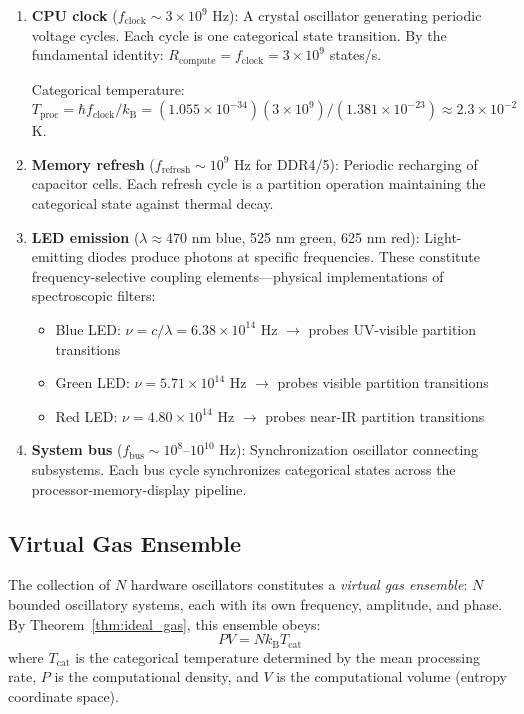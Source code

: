 \documentclass[11pt,a4paper]{article}
\theoremstyle{definition}
\theoremstyle{remark}
\newcommand{\kB}{k_{\mathrm{B}}}
\begin{document}
\begin{enumerate}
\item \textbf{CPU clock} ($f_{\mathrm{clock}} \sim 3 \times 10^9$ Hz): A crystal oscillator generating periodic voltage cycles. Each cycle is one categorical state transition. By the fundamental identity: $R_{\mathrm{compute}} = f_{\mathrm{clock}} = 3 \times 10^9$ states/s.

Categorical temperature: $T_{\mathrm{proc}} = \hbar f_{\mathrm{clock}} / \kB = (1.055 \times 10^{-34})(3 \times 10^9)/(1.381 \times 10^{-23}) \approx 2.3 \times 10^{-2}$ K.

\item \textbf{Memory refresh} ($f_{\mathrm{refresh}} \sim 10^9$ Hz for DDR4/5): Periodic recharging of capacitor cells. Each refresh cycle is a partition operation maintaining the categorical state against thermal decay.

\item \textbf{LED emission} ($\lambda \approx 470$ nm blue, 525 nm green, 625 nm red): Light-emitting diodes produce photons at specific frequencies. These constitute frequency-selective coupling elements---physical implementations of spectroscopic filters:
\begin{itemize}[nosep]
\item Blue LED: $\nu = c/\lambda = 6.38 \times 10^{14}$ Hz $\to$ probes UV-visible partition transitions
\item Green LED: $\nu = 5.71 \times 10^{14}$ Hz $\to$ probes visible partition transitions
\item Red LED: $\nu = 4.80 \times 10^{14}$ Hz $\to$ probes near-IR partition transitions
\end{itemize}

\item \textbf{System bus} ($f_{\mathrm{bus}} \sim 10^8$--$10^{10}$ Hz): Synchronization oscillator connecting subsystems. Each bus cycle synchronizes categorical states across the processor-memory-display pipeline.
\end{enumerate}

\subsection{Virtual Gas Ensemble}

The collection of $N$ hardware oscillators constitutes a \emph{virtual gas ensemble}: $N$ bounded oscillatory systems, each with its own frequency, amplitude, and phase. By Theorem~\ref{thm:ideal_gas}, this ensemble obeys:
\begin{equation}
PV = N\kB T_{\mathrm{cat}}
\end{equation}
where $T_{\mathrm{cat}}$ is the categorical temperature determined by the mean processing rate, $P$ is the computational density, and $V$ is the computational volume (entropy coordinate space).
\end{document}
